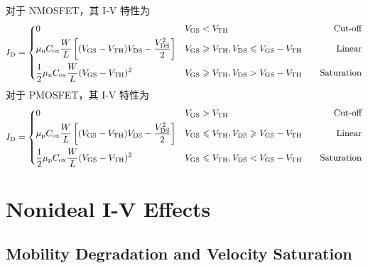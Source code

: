 对于 NMOSFET，其 I-V 特性为
\begin{equation}
    I_{\mathrm{D}} = 
    \begin{dcases}  %
        \begin{aligned}
            & 0 && V_{\mathrm{GS}} < V_{\mathrm{TH}} &&& \text{Cut-off} \\
            & \mu_{\mathrm{n}} C_{\mathrm{ox}} \frac{W}{L} \left[ (V_{\mathrm{GS}} - V_{\mathrm{TH}}) V_{\mathrm{DS}} - \frac{V_{\mathrm{DS}}^2}{2} \right] && V_{\mathrm{GS}} \geqslant V_{\mathrm{TH}}, V_{\mathrm{DS}} \leqslant V_{\mathrm{GS}} - V_{\mathrm{TH}} &&& \text{Linear} \\
            & \frac{1}{2} \mu_{\mathrm{n}} C_{\mathrm{ox}} \frac{W}{L} (V_{\mathrm{GS}} - V_{\mathrm{TH}})^2 && V_{\mathrm{GS}} \geqslant V_{\mathrm{TH}}, V_{\mathrm{DS}} > V_{\mathrm{GS}} - V_{\mathrm{TH}} &&& \text{Saturation}
        \end{aligned}
    \end{dcases}
\end{equation}
对于 PMOSFET，其 I-V 特性为
\begin{equation}
    I_{\mathrm{D}} = 
    \begin{dcases}  %
        \begin{aligned}
            & 0 && V_{\mathrm{GS}} > V_{\mathrm{TH}} &&& \text{Cut-off} \\
            & \mu_{\mathrm{p}} C_{\mathrm{ox}} \frac{W}{L} \left[ (V_{\mathrm{GS}} - V_{\mathrm{TH}}) V_{\mathrm{DS}} - \frac{V_{\mathrm{DS}}^2}{2} \right] && V_{\mathrm{GS}} \leqslant V_{\mathrm{TH}}, V_{\mathrm{DS}} \geqslant V_{\mathrm{GS}} - V_{\mathrm{TH}} &&& \text{Linear} \\
            & \frac{1}{2} \mu_{\mathrm{p}} C_{\mathrm{ox}} \frac{W}{L} (V_{\mathrm{GS}} - V_{\mathrm{TH}})^2 && V_{\mathrm{GS}} \leqslant V_{\mathrm{TH}}, V_{\mathrm{DS}} < V_{\mathrm{GS}} - V_{\mathrm{TH}} &&& \text{Saturation}
        \end{aligned}
    \end{dcases}
\end{equation}

\section{Nonideal I-V Effects}

\subsection{Mobility Degradation and Velocity Saturation}

